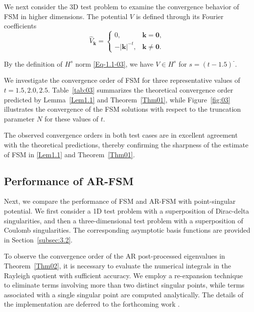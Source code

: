 \documentclass{sn-jnl}%
\newcommand{\m}{\textbf{-}}
\numberwithin{equation}{section}
\theoremstyle{thmstyleone}%
\theoremstyle{thmstyletwo}%
\theoremstyle{thmstylethree}%
\begin{document}
We next consider the 3D test problem to examine the convergence behavior of FSM in higher dimensions.
The potential $V$ is defined through its Fourier coefficients
\begin{equation}\label{Eq-4.1-02}
\hat{V}_{\bm k} =
\begin{cases}
0, & \bm k=\bm 0,\\
-|\bm k|^{-t}, & \bm k\neq \bm 0.
\end{cases}
\end{equation}

By the definition of $H^s$ norm \eqref{Eq-1.1-03}, we have $V \in H^{s}$ for $s=(t-1.5)^{\m}$.

We investigate the convergence order of FSM for three representative values of $t=1.5, 2.0,2.5$. Table~\ref{tab:03} summarizes the theoretical convergence order predicted by Lemma~\ref{Lem1.1} and Theorem~\ref{Thm01}, while Figure~\ref{fig:03} illustrates the convergence of the FSM solutions with respect to the truncation parameter $N$ for these values of $t$. 

 The observed convergence orders in both test cases are in excellent agreement with the theoretical predictions, thereby confirming the sharpness of the estimate of FSM in \ref{Lem1.1} and Theorem~\ref{Thm01}.


\subsection{Performance of AR-FSM}

Next, we compare the performance of FSM and AR-FSM  with point-singular potential.
We first consider a 1D test problem with a superposition of Dirac-delta singularities, and then a three-dimensional test problem with a superposition of Coulomb singularities. The corresponding asymptotic basis functions are provided in Section~\ref{subsec:3.2}.

To observe the convergence order of the AR post-processed eigenvalues in Theorem~\ref{Thm02}, it is necessary to evaluate the numerical integrals in the Rayleigh quotient with sufficient accuracy. We employ a re-expansion technique to eliminate terms involving more than two distinct singular points, while terms associated with a single singular point are computed analytically. The details of the implementation are deferred to  the forthcoming work \cite{lipreparationEFSM}.
\end{document}
